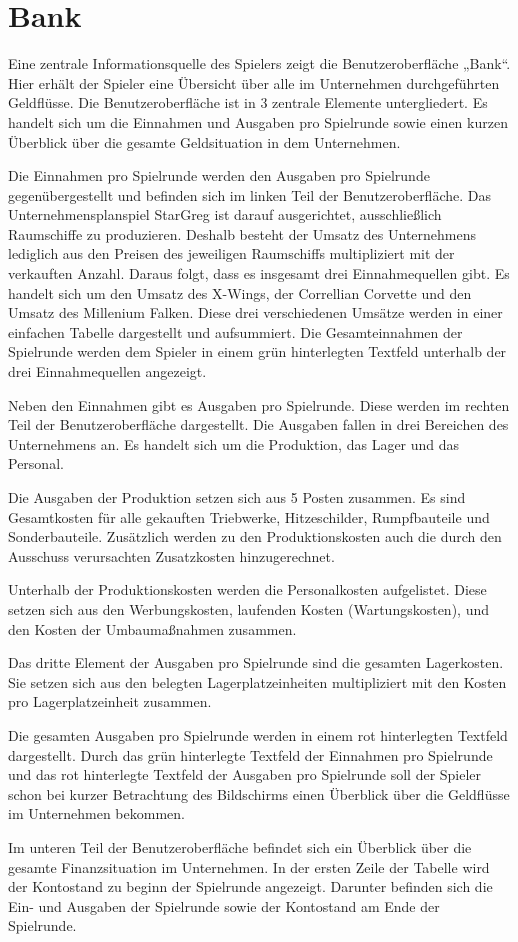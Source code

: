 \section{Bank}
\label{sec:ui-bank}

Eine zentrale Informationsquelle des Spielers zeigt die Benutzeroberfläche „Bank“. Hier erhält der Spieler eine Übersicht über alle im Unternehmen durchgeführten Geldflüsse. Die Benutzeroberfläche ist in 3 zentrale Elemente untergliedert. Es handelt sich um die Einnahmen und Ausgaben pro Spielrunde sowie einen kurzen Überblick über die gesamte Geldsituation in dem Unternehmen.
 
Die Einnahmen pro Spielrunde werden den Ausgaben pro Spielrunde gegenübergestellt und befinden sich im linken Teil der Benutzeroberfläche. Das Unternehmensplanspiel StarGreg ist darauf ausgerichtet, ausschließlich Raumschiffe zu produzieren. Deshalb besteht der Umsatz des Unternehmens lediglich aus den Preisen des jeweiligen Raumschiffs multipliziert mit der verkauften Anzahl. Daraus folgt, dass es insgesamt drei Einnahmequellen gibt. Es handelt sich um den Umsatz des X-Wings, der Correllian Corvette und den Umsatz des Millenium Falken. Diese drei verschiedenen Umsätze werden in einer einfachen Tabelle dargestellt und aufsummiert. Die Gesamteinnahmen der Spielrunde werden dem Spieler in einem grün hinterlegten Textfeld unterhalb der drei Einnahmequellen angezeigt.
 
Neben den Einnahmen gibt es Ausgaben pro Spielrunde. Diese werden im rechten Teil der Benutzeroberfläche dargestellt. Die Ausgaben fallen in drei Bereichen des Unternehmens an. Es handelt sich um die Produktion, das Lager und das Personal.
 
Die Ausgaben der Produktion setzen sich aus 5 Posten zusammen. Es sind Gesamtkosten für alle gekauften Triebwerke, Hitzeschilder, Rumpfbauteile und Sonderbauteile. Zusätzlich werden zu den Produktionskosten auch die durch den Ausschuss verursachten  Zusatzkosten hinzugerechnet.
 
Unterhalb der Produktionskosten werden die Personalkosten aufgelistet. Diese setzen sich aus den Werbungskosten, laufenden Kosten (Wartungskosten), und den Kosten der Umbaumaßnahmen zusammen.
 
Das dritte Element der Ausgaben pro Spielrunde sind die gesamten Lagerkosten. Sie setzen sich aus den belegten Lagerplatzeinheiten multipliziert mit den Kosten pro Lagerplatzeinheit zusammen.
 
Die gesamten Ausgaben pro Spielrunde werden in einem rot hinterlegten Textfeld dargestellt. Durch das grün hinterlegte Textfeld der Einnahmen pro Spielrunde und das rot hinterlegte Textfeld der Ausgaben pro Spielrunde soll der Spieler schon bei kurzer Betrachtung des Bildschirms einen Überblick über die Geldflüsse im Unternehmen bekommen.
 
 
Im unteren Teil der Benutzeroberfläche befindet sich ein Überblick über die gesamte Finanzsituation im Unternehmen. In der ersten Zeile der Tabelle wird der Kontostand zu beginn der Spielrunde angezeigt. Darunter befinden sich die Ein- und Ausgaben der Spielrunde sowie der Kontostand am Ende der Spielrunde. 